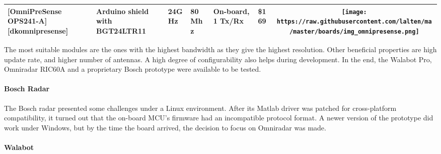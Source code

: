 \begin{longtable}[]{@{}llllllc@{}}
\begin{minipage}[t]{0.09\columnwidth}
{[}OmniPreSense OPS241-A{]}{[}dkomnipresense{]}\strut
\end{minipage} & \begin{minipage}[t]{0.13\columnwidth}\raggedright\strut
Arduino shield with BGT24LTR11\strut
\end{minipage} & \begin{minipage}[t]{0.09\columnwidth}\raggedright\strut
24GHz\strut
\end{minipage} & \begin{minipage}[t]{0.11\columnwidth}\raggedright\strut
80Mhz\strut
\end{minipage} & \begin{minipage}[t]{0.10\columnwidth}\raggedright\strut
On-board, 1 Tx/Rx\strut
\end{minipage} & \begin{minipage}[t]{0.15\columnwidth}\raggedright\strut
\$169\strut
\end{minipage} & \begin{minipage}[t]{0.10\columnwidth}\centering\strut
\texttt{[image: https://raw.githubusercontent.com/lalten/ma/master/boards/img\_omnipresense.png]}\strut
\end{minipage}\tabularnewline
\bottomrule
\end{longtable}

The most suitable modules are the ones with the highest bandwidth as
they give the highest resolution. Other beneficial properties are high
update rate, and higher number of antennas. A high degree of
configurability also helps during development. In the end, the Walabot
Pro, Omniradar RIC60A and a proprietary Bosch prototype were available
to be tested.

\paragraph{Bosch Radar}\label{bosch-radar}

The Bosch radar presented some challenges under a Linux environment.
After its Matlab driver was patched for cross-platform compatibility, it
turned out that the on-board MCU's firmware had an incompatible protocol
format. A newer version of the prototype did work under Windows, but by
the time the board arrived, the decision to focus on Omniradar was made.

\paragraph{Walabot}\label{walabot}

